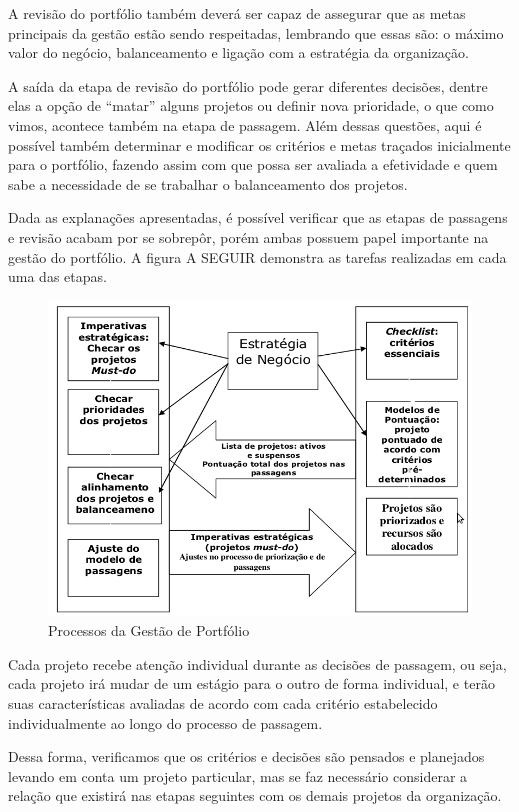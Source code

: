 \documentclass[12pt,a4paper,ruledheader,tocpage=prefix,floatnumber=continuous,pagestart=folhaderosto,font=times]{abnt}
\begin{document}
A revisão do portfólio também deverá ser capaz de assegurar que as metas principais da gestão estão sendo respeitadas, lembrando que 
essas são: o máximo valor do negócio, balanceamento e ligação com a estratégia da organização.

A saída da etapa de revisão do portfólio pode gerar diferentes decisões, dentre elas a opção de ``matar'' alguns projetos ou definir nova prioridade, o que
como vimos, acontece também na etapa de passagem. Além dessas questões, aqui é possível também determinar e modificar os critérios e metas traçados inicialmente
para o portfólio, fazendo assim com que possa ser avaliada a efetividade e quem sabe a necessidade de se trabalhar o balanceamento dos projetos.

Dada as explanações apresentadas, é possível verificar que as etapas de passagens e revisão acabam por se sobrepôr, porém ambas possuem papel
importante na gestão do portfólio. A figura A SEGUIR demonstra as tarefas realizadas em cada uma das etapas.

\begin{figure}[H]
\centering
\includegraphics[width=.9\textwidth]{gpp_total_cooper.png}
\caption{Processos da Gestão de Portfólio\cite{cooper}}
\end{figure}

Cada projeto recebe atenção individual durante as decisões de passagem, ou seja, cada projeto irá mudar de um estágio para o outro de forma individual,
e terão suas características avaliadas de acordo com cada critério estabelecido individualmente ao longo do processo de passagem. 

Dessa forma, verificamos que os critérios e decisões são pensados e planejados levando em conta um projeto particular, mas se faz necessário considerar
a relação que existirá nas etapas seguintes com os demais projetos da organização.
\end{document}
